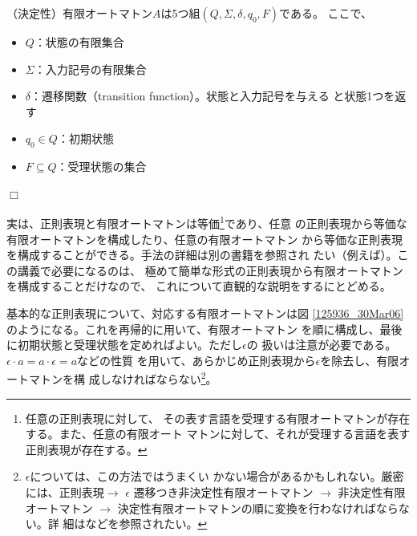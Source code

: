 \begin{definition}
 （決定性）有限オートマトン$A$は5つ組$(Q, \Sigma, \delta, q_0, F)$である。
 ここで、
 \begin{itemize}
  \item $Q$：状態の有限集合
  \item $\Sigma$：入力記号の有限集合
  \item $\delta$：遷移関数（transition function）。状態と入力記号を与える
	と状態1つを返す
  \item $q_0 \in Q$：初期状態
  \item $F \subseteq Q$：受理状態の集合
 \end{itemize}$\Box$
\end{definition}


実は、正則表現と有限オートマトンは等価\footnote{任意の正則表現に対して、
その表す言語を受理する有限オートマトンが存在する。また、任意の有限オート
マトンに対して、それが受理する言語を表す正則表現が存在する。}であり、任意
の正則表現から等価な有限オートマトンを構成したり、任意の有限オートマトン
から等価な正則表現を構成することができる。手法の詳細は別の書籍を参照され
たい（例えば\cite{ホップクロフト03:automaton}）。この講義で必要になるのは、
極めて簡単な形式の正則表現から有限オートマトンを構成することだけなので、
これについて直観的な説明をするにとどめる。

基本的な正則表現について、対応する有限オートマトンは図
\ref{125936_30Mar06}のようになる。これを再帰的に用いて、有限オートマトン
を順に構成し、最後に初期状態と受理状態を定めればよい。ただし$\epsilon$の
扱いは注意が必要である。$\epsilon\cdot a = a\cdot\epsilon = a$などの性質
を用いて、あらかじめ正則表現から$\epsilon$を除去し、有限オートマトンを構
成しなければならない\footnote{$\epsilon$については、この方法ではうまくい
かない場合があるかもしれない。厳密には、正則表現$\rightarrow$ $\epsilon$
遷移つき非決定性有限オートマトン $\rightarrow$ 非決定性有限オートマトン
$\rightarrow$ 決定性有限オートマトンの順に変換を行わなければならない。詳
細は\cite{ホップクロフト03:automaton}などを参照されたい。}。


